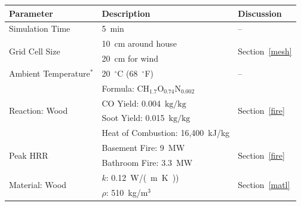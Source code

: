 \documentclass[12pt,oneside]{book}
\renewcommand{\C}{\mbox{C}}
\renewcommand{\H}{\mbox{H}}
\renewcommand{\O}{\mbox{O}}
\newcommand{\N}{\mbox{N}}
\begin{document}
\begin{table}
\centering
{}\label{tab:mod_param}
\begin{tabular}{lll}
\toprule[1.5pt]
Parameter                                                  & Description                                   & Discussion                            \\
\midrule
Simulation Time                                            &  5~min                                        & --                                    \\ [.25cm]
\multirow{2}{*}{Grid Cell Size}                            &  10~cm around house                           & \multirow{2}{*}{Section~\ref{mesh}}   \\ 
                                                           &  20~cm for wind                               &                                       \\ [.25cm]
Ambient Temperature$^*$                                    &  20~$^{\circ}$C (68~$^{\circ}$F)              & --                                    \\ [.1cm]
\multirow{4}{*}{Reaction: Wood~\cite{SFPE:Tewarson}}       &  Formula: $\C\H_{1.7}\O_{0.74}\N_{0.002}$     & \multirow{4}{*}{Section~\ref{fire}}   \\
                                                           &  CO Yield: 0.004~$\mathrm{kg}/\mathrm{kg}$    &                                       \\
                                                           &  Soot Yield: 0.015~$\mathrm{kg}/\mathrm{kg}$  &                                       \\
                                                           &  Heat of Combustion: 16,400~kJ/kg             &                                       \\ [.25cm]
\multirow{2}{*}{Peak HRR}                                  &  Basement Fire: 9~MW                          & \multirow{2}{*}{Section~\ref{fire}}   \\ 
                                                           &  Bathroom Fire: 3.3~MW                        &                                       \\ [.25cm]                     
\multirow{3}{*}{Material: Wood~\cite{Incropera:1} }        &  $k$: 0.12~\si{W/(m.K)})                      & \multirow{3}{*}{Section~\ref{matl}}   \\
                                                           &  $\rho$: 510~kg/m$^3$                         &                                       \\

\end{tabular}
\end{table}
\end{document}

